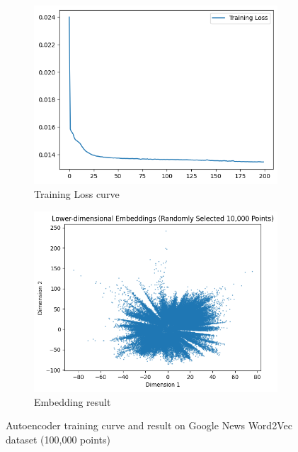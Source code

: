\begin{itemize}
\begin{itemize}
            \begin{figure}[H]
            \centering
            \begin{subfigure}{0.45\textwidth}
                \includegraphics[width=\linewidth]{images/autoencoder_training_word2vec.png}
                \caption{Training Loss curve}
                \label{fig:autoencoder-training-word2vec}
            \end{subfigure}
            \begin{subfigure}{0.45\textwidth}
                \includegraphics[width=\linewidth]{images/autoencoder_result_word2vec.png}
                \caption{Embedding result}
                \label{fig:autoencoder-result-word2vec}
            \end{subfigure}
            \caption{Autoencoder training curve and result on Google News Word2Vec dataset (100,000 points)}
            \label{fig:autoencoderword2vec}
        \end{figure}

        
        \end{itemize}
            
\end{itemize}